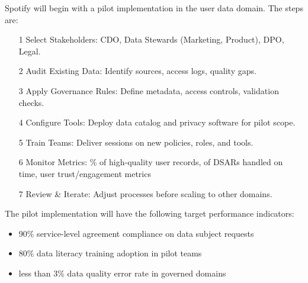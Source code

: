 \documentclass[11pt,a4paper,computermodern]{article}
\begin{document}
Spotify will begin with a pilot implementation in the user data domain. The steps are:
\begin{itemize}
	\item[1] Select Stakeholders: CDO, Data Stewards (Marketing, Product), DPO, Legal.
	\item[2] Audit Existing Data: Identify sources, access logs, quality gaps.
	\item[3] Apply Governance Rules: Define metadata, access controls, validation checks.
	\item[4] Configure Tools: Deploy data catalog and privacy software for pilot scope.
	\item[5] Train Teams: Deliver sessions on new policies, roles, and tools.
	\item[6] Monitor Metrics: \% of high-quality user records, of DSARs handled on time, user trust/engagement metrics
	\item[7] Review \& Iterate: Adjust processes before scaling to other domains.
\end{itemize}

The pilot implementation will have the following target performance indicators:
\begin{itemize}
	\item 90\% service-level agreement compliance on data subject requests
	\item 80\% data literacy training adoption in pilot teams
	\item  less than 3\% data quality error rate in governed domains
\end{itemize}
\end{document}
